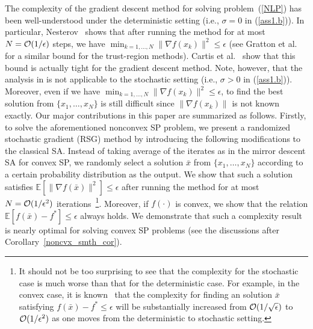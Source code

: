 \documentclass[final]{siamltex}
\def\eqnok#1{(\ref{#1})}
\newcommand{\bbe}{\mathbb{E}}
\begin{document}
The complexity of the gradient descent method for solving problem~\eqnok{NLP} has been well-understood
under the deterministic setting (i.e., $\sigma = 0$ in \eqnok{ass1.b}).
In particular, Nesterov~\cite{Nest04} shows that after running the
method for at most $N = {\cal O}(1/\epsilon)$ steps, we have
$\min_{k=1, \ldots, N} \|\nabla f(x_k)\|^2 \le \epsilon$ (see Gratton et al.~\cite{GraSarToi08}
for a similar bound for the trust-region methods).
Cartis et al.~\cite{CarGouToi10-1} show that this bound is actually
tight for the gradient descent method. Note, however, that the analysis in \cite{Nest04}
is not applicable to the stochastic setting (i.e., $\sigma > 0$ in \eqnok{ass1.b}). Moreover, even if we have
$\min_{k=1, \ldots, N} \|\nabla f(x_k)\|^2 \le \epsilon$, to
find the best solution from $\{x_1, \ldots, x_N\}$ is still difficult
since $\|\nabla f(x_k)\|$ is not known exactly.
Our major contributions in this paper are summarized as follows. Firstly,
to solve the aforementioned nonconvex SP problem, we present a randomized stochastic gradient (RSG) method
by introducing the following modifications to the classical SA.
Instead of taking average of the iterates as in the mirror descent SA
for convex SP, we randomly select a solution $\bar x$ from
$\{x_1, \ldots, x_N\}$ according to a certain probability distribution as the output. We show that such a solution satisfies
$\bbe[\|\nabla f(\bar x)\|^2] \le \epsilon$ after running the method for at most $N = {\cal O}(1/\epsilon^2)$
iterations~\footnote{It should not be too surprising to see that
the complexity for the stochastic case is much worse than that for the deterministic case.
For example, in the convex case, it is known~\cite{Nest04,Lan10-3} that the complexity for finding an solution $\bar x$ satisfying
$f(\bar x) - f^* \le \epsilon$ will be substantially increased from ${\cal O}(1/\sqrt{\epsilon})$ to
${\cal O}(1/\epsilon^2)$ as one moves from the deterministic to stochastic setting.}.
Moreover, if $f(\cdot)$ is convex, we show that the relation $\bbe[f(\bar x) - f^*] \le \epsilon$ always holds.
We demonstrate that such a complexity result is nearly optimal for solving convex SP problems (see the discussions after
Corollary~\ref{noncvx_smth_cor}).
\end{document}
